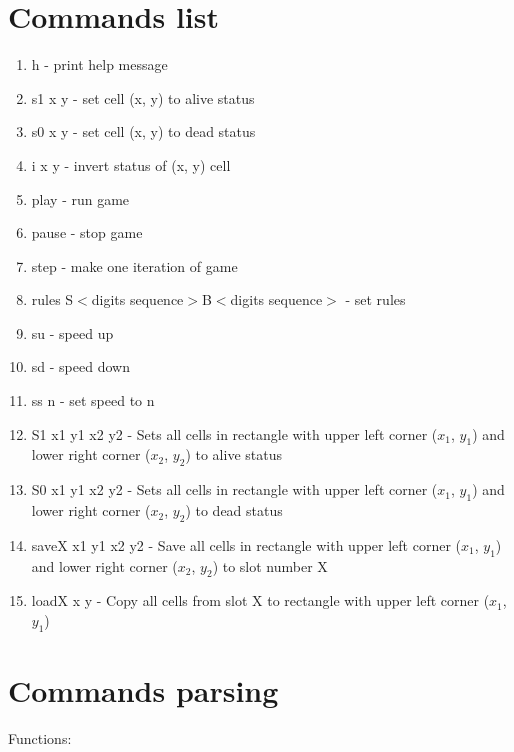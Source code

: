 \section*{Commands list}

\begin{enumerate}
	\item \textsf{h} - print help message
	\item \textsf{s1 x y} - set cell (x, y) to alive status
	\item \textsf{s0 x y} - set cell (x, y) to dead status
	\item \textsf{i x y} - invert status of (x, y) cell
	\item \textsf{play} - run game
	\item \textsf{pause} - stop game
	\item \textsf{step} - make one iteration of game
	\item \textsf{rules S$<$digits sequence$>$B$<$digits sequence$>$} - set rules
	\item \textsf{su} - speed up
	\item \textsf{sd} - speed down
	\item \textsf{ss n} - set speed to n
	\item \textsf{S1 x1 y1 x2 y2} -  Sets all cells in rectangle with upper left corner ($x_{1}$, $y_{1}$) and lower right corner ($x_{2}$, $y_{2}$) to alive status
	\item \textsf{S0 x1 y1 x2 y2} -  Sets all cells in rectangle with upper left corner ($x_{1}$, $y_{1}$) and lower right corner ($x_{2}$, $y_{2}$) to dead status
	\item \textsf{saveX x1 y1 x2 y2} - Save all cells in rectangle with upper left corner ($x_{1}$, $y_{1}$) and lower right corner ($x_{2}$, $y_{2}$) to slot number X
	\item \textsf{loadX x y} - Copy all cells from slot X to rectangle with upper left corner ($x_{1}$, $y_{1}$)
\end{enumerate}

\section*{Commands parsing}

Functions:

